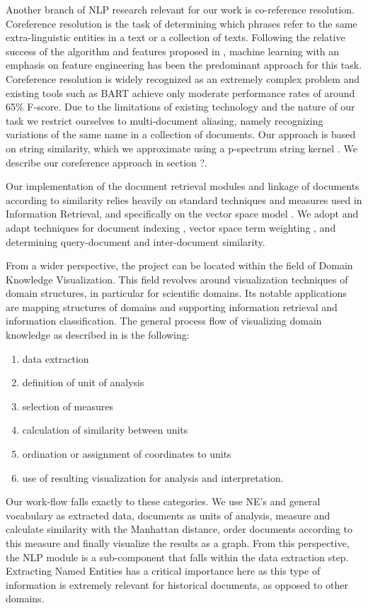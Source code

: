 Another branch of NLP research relevant for our work is co-reference resolution. 
Coreference resolution is the task of determining which phrases refer to the same extra-linguistic entities in a text or a collection of texts.
Following the relative success of the algorithm and features proposed in \cite {soon2001coreference}, machine learning 
with an emphasis on feature engineering has been the predominant approach for this task. Coreference resolution is widely 
recognized as an extremely complex problem and existing tools such as BART \cite{bart} achieve only moderate performance rates 
of around 65\% F-score. Due to the limitations of existing technology and the nature of our task we restrict ourselves to multi-document 
aliasing, namely recognizing variations of the same name in a collection of documents. Our approach is based on string similarity, 
which we approximate using a p-spectrum string kernel \cite{kernels2004}. We describe our coreference approach in section ?.

Our implementation of the document retrieval modules and linkage of documents according to similarity relies heavily on standard techniques 
and measures used in Information Retrieval, and  specifically on the vector space model \cite{ir2008}. We adopt and adapt techniques for 
document indexing \cite{indexing1999}, vector space term weighting \cite{jones2004}, \cite{salton1971} and determining query-document and 
inter-document similarity. 

From a wider perspective, the project can be located within the field of Domain Knowledge Visualization. This field revolves around visualization
techniques of domain structures, in particular for scientific domains. Its notable applications are mapping structures of domains and supporting
information retrieval and information classification.
The general process flow of visualizing domain knowledge as described in
\cite{visualizing2003} is the following: 
\begin{enumerate}
\item data extraction 
\item definition of unit of analysis 
\item selection of measures 
\item calculation of similarity between units 
\item ordination or assignment of coordinates to units 
\item use of resulting visualization for analysis and interpretation.
\end{enumerate}
Our work-flow falls exactly to these categories. We use NE's and general vocabulary as extracted data, documents as units of analysis, measure and calculate similarity with the Manhattan distance, order documents according to this measure and finally visualize the results as a graph.
From this perspective, the NLP module is a sub-component that falls within the data extraction step. Extracting Named Entities has a critical importance
here as this type of information is extremely relevant for historical documents, as opposed to other domains.  

